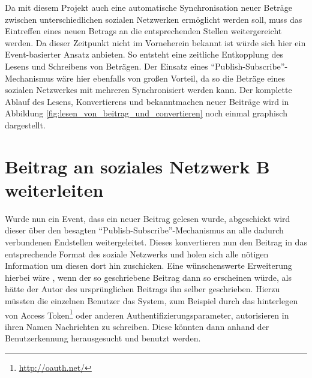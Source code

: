 \medskip

Da mit diesem Projekt auch eine automatische Synchronisation neuer Beträge zwischen unterschiedlichen sozialen Netzwerken ermöglicht werden soll, muss das Eintreffen eines neuen Betrags an die entsprechenden Stellen weitergereicht werden. Da dieser Zeitpunkt nicht im Vorneherein bekannt ist würde sich hier ein Event-basierter Ansatz anbieten. So entsteht eine zeitliche Entkopplung des Lesens und Schreibens von Beträgen. Der Einsatz eines \enquote{Publish-Subscribe}-Mechanismus wäre hier ebenfalls von großen Vorteil, da so die Beträge eines sozialen Netzwerkes mit mehreren Synchronisiert werden kann. Der komplette Ablauf des Lesens, Konvertierens und bekanntmachen neuer Beiträge wird in Abbildung \ref{fig:lesen_von_beitrag_und_convertieren} noch einmal graphisch dargestellt.


\section{Beitrag an soziales Netzwerk B weiterleiten} %
\label{sec:beitrag_an_soziales_netzwerk_b_weiterleiten}


Wurde nun ein Event, dass ein neuer Beitrag gelesen wurde, abgeschickt wird dieser über den besagten \enquote{Publish-Subscribe}-Mechanismus an alle dadurch verbundenen Endstellen weitergeleitet. Dieses konvertieren nun den Beitrag in das entsprechende Format des soziale Netzwerks und holen sich alle nötigen Information um diesen dort hin zuschicken. Eine wünschenswerte Erweiterung hierbei wäre , wenn der so geschriebene Beitrag dann so erscheinen würde, als hätte der Autor des ursprünglichen Beitrags ihn selber geschrieben. Hierzu müssten die einzelnen Benutzer das System, zum Beispiel durch das hinterlegen von Access Token\footnote{\url{http://oauth.net/}} oder anderen Authentifizierungsparameter, autorisieren in ihren Namen Nachrichten zu schreiben. Diese könnten dann anhand der Benutzerkennung herausgesucht und benutzt werden. 

